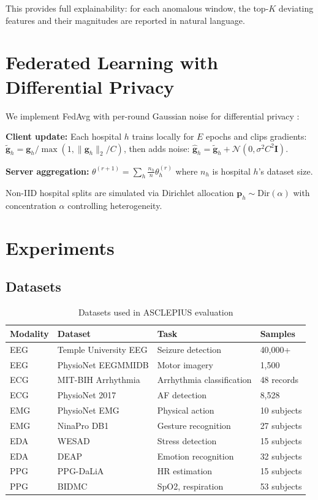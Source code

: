 \documentclass[journal]{IEEEtran}
\begin{document}
This provides full explainability: for each anomalous window, the top-$K$
deviating features and their magnitudes are reported in natural language.

\section{Federated Learning with Differential Privacy}
\label{sec:federated}

We implement FedAvg \cite{mcmahan2017communication} with per-round Gaussian
noise for differential privacy \cite{dwork2014algorithmic}:

\textbf{Client update:} Each hospital $h$ trains locally for $E$ epochs and
clips gradients: $\tilde{\mathbf{g}}_h = \mathbf{g}_h / \max(1, \|\mathbf{g}_h\|_2 / C)$,
then adds noise: $\hat{\mathbf{g}}_h = \tilde{\mathbf{g}}_h + \mathcal{N}(0, \sigma^2 C^2 \mathbf{I})$.

\textbf{Server aggregation:}
$\theta^{(r+1)} = \sum_{h} \frac{n_h}{n} \theta_h^{(r)}$
where $n_h$ is hospital $h$'s dataset size.

Non-IID hospital splits are simulated via Dirichlet allocation
$\mathbf{p}_h \sim \text{Dir}(\alpha)$ with concentration $\alpha$ controlling
heterogeneity.

\section{Experiments}
\label{sec:experiments}

\subsection{Datasets}

\begin{table}[h]
\caption{Datasets used in ASCLEPIUS evaluation}
\label{tab:datasets}
\centering
\begin{tabular}{llll}
\toprule
Modality & Dataset & Task & Samples \\
\midrule
EEG & Temple University EEG & Seizure detection & 40,000+ \\
EEG & PhysioNet EEGMMIDB & Motor imagery & 1,500 \\
ECG & MIT-BIH Arrhythmia & Arrhythmia classification & 48 records \\
ECG & PhysioNet 2017 & AF detection & 8,528 \\
EMG & PhysioNet EMG & Physical action & 10 subjects \\
EMG & NinaPro DB1 & Gesture recognition & 27 subjects \\
EDA & WESAD & Stress detection & 15 subjects \\
EDA & DEAP & Emotion recognition & 32 subjects \\
PPG & PPG-DaLiA & HR estimation & 15 subjects \\
PPG & BIDMC & SpO2, respiration & 53 subjects \\
\bottomrule
\end{tabular}
\end{table}
\end{document}
